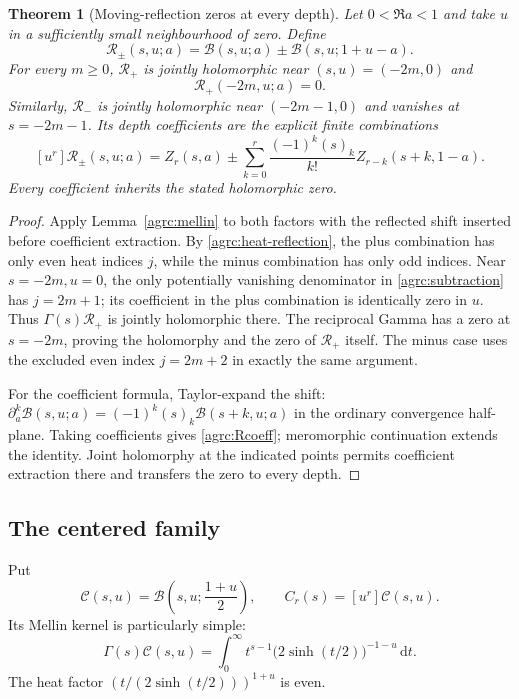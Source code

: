 \documentclass[11pt]{article}
\numberwithin{equation}{section}
\newtheorem{theorem}{Theorem}[section]
\theoremstyle{definition}\newtheorem{definition}[theorem]{Definition}
\theoremstyle{remark}\newtheorem{remark}[theorem]{Remark}
\newcommand{\Bcal}{\mathcal B}
\newcommand{\Ccal}{\mathcal C}
\newcommand{\dd}{\,\mathrm d}
\begin{document}
\begin{theorem}[Moving-reflection zeros at every depth]
\label{agrc:moving-reflection}
Let $0<\Re a<1$ and take $u$ in a sufficiently small neighbourhood of
zero. Define
\[
 \mathcal R_\pm(s,u;a)=\Bcal(s,u;a)\pm\Bcal(s,u;1+u-a).
\]
For every $m\geq0$, $\mathcal R_+$ is jointly holomorphic near
$(s,u)=(-2m,0)$ and
\begin{equation}\label{agrc:Rplus-zero}
 \mathcal R_+(-2m,u;a)=0.
\end{equation}
Similarly, $\mathcal R_-$ is jointly holomorphic near
$(-2m-1,0)$ and vanishes at $s=-2m-1$.
Its depth coefficients are the explicit finite combinations
\begin{equation}\label{agrc:Rcoeff}
 [u^r]\mathcal R_\pm(s,u;a)=
 Z_r(s,a)\pm\sum_{k=0}^r\frac{(-1)^k(s)_k}{k!}
                                  Z_{r-k}(s+k,1-a).
\end{equation}
Every coefficient inherits the stated holomorphic zero.
\end{theorem}
\begin{proof}
Apply Lemma~\ref{agrc:mellin} to both factors with the reflected shift
inserted before coefficient extraction. By \eqref{agrc:heat-reflection},
the plus combination has only even heat indices $j$, while the minus
combination has only odd indices. Near $s=-2m,u=0$, the only potentially
vanishing denominator in \eqref{agrc:subtraction} has $j=2m+1$; its
coefficient in the plus combination is identically zero in $u$.
Thus $\Gamma(s)\mathcal R_+$ is jointly holomorphic there. The reciprocal
Gamma has a zero at $s=-2m$, proving the holomorphy and the zero of
$\mathcal R_+$ itself. The minus case uses the excluded even index
$j=2m+2$ in exactly the same argument.

For the coefficient formula, Taylor-expand the shift:
$\partial_a^k\Bcal(s,u;a)=(-1)^k(s)_k\Bcal(s+k,u;a)$
in the ordinary convergence half-plane. Taking coefficients gives
\eqref{agrc:Rcoeff}; meromorphic continuation extends the identity.
Joint holomorphy at the indicated points permits coefficient extraction
there and transfers the zero to every depth.
\end{proof}

\subsection{The centered family}

Put
\begin{equation}\label{agrc:center-family}
 \Ccal(s,u)=\Bcal\left(s,u;\frac{1+u}{2}\right),
 \qquad C_r(s)=[u^r]\Ccal(s,u).
\end{equation}
Its Mellin kernel is particularly simple:
\begin{equation}\label{agrc:center-Mellin}
 \Gamma(s)\Ccal(s,u)=\int_0^\infty
               t^{s-1}\bigl(2\sinh(t/2)\bigr)^{-1-u}\dd t.
\end{equation}
The heat factor
$(t/(2\sinh(t/2)))^{1+u}$ is even.
\end{document}
